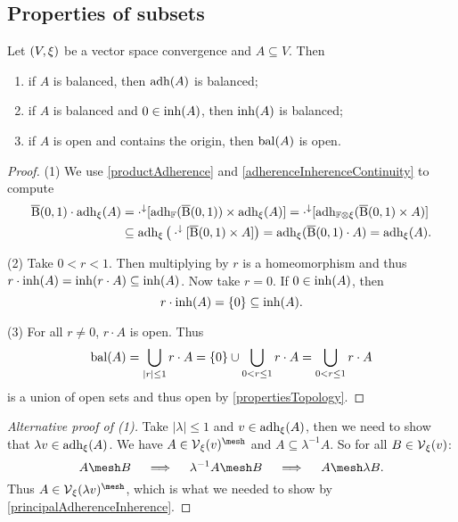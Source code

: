 \subsection{Properties of subsets}
\begin{proposition} \label{inherenceAdherenceBalanced}
Let $\left( V,\xi \right)$ be a vector space convergence and $A\subseteq V$. Then
\begin{enumerate}
\item if $A$ is balanced, then $\operatorname{adh}(A)$ is balanced;
\item if $A$ is balanced and $0\in\operatorname{inh}(A)$, then $\operatorname{inh}(A)$ is balanced;
\item if $A$ is open and contains the origin, then $\operatorname{bal}(A)$ is open.
\end{enumerate}
\end{proposition}
\begin{proof}
(1) We use \ref{productAdherence} and \ref{adherenceInherenceContinuity} to compute
\begin{align*}
\operatorname{\overline{B}}(0,1)\cdot \operatorname{adh}_\xi(A) &= \cdot^\downarrow[\operatorname{adh}_{\mathbb{F}}(\operatorname{\overline{B}}(0,1))\times \operatorname{adh}_\xi(A)] = \cdot^\downarrow[\operatorname{adh}_{\mathbb{F}\otimes \xi}(\operatorname{\overline{B}}(0,1)\times A)] \\
&\subseteq \operatorname{adh}_{\xi}\big(\cdot^\downarrow[\operatorname{\overline{B}}(0,1)\times A]\big) = \operatorname{adh}_{\xi}(\operatorname{\overline{B}}(0,1)\cdot A) = \operatorname{adh}_\xi(A).
\end{align*}

(2) Take $0<r<1$. Then multiplying by $r$ is a homeomorphism and thus $r\cdot\operatorname{inh}(A) = \operatorname{inh}(r\cdot A) \subseteq \operatorname{inh}(A)$. Now take $r=0$. If $0\in\operatorname{inh}(A)$, then
\[ r\cdot\operatorname{inh}(A) = \{0\} \subseteq \operatorname{inh}(A). \]

(3) For all $r\neq 0$, $r\cdot A$ is open. Thus
\[ \operatorname{bal}(A) = \bigcup_{|r|\leq 1}r\cdot A = \{0\}\cup \bigcup_{0< r\leq 1}r\cdot A = \bigcup_{0< r\leq 1}r\cdot A \]
is a union of open sets and thus open by \ref{propertiesTopology}.
\end{proof}
\begin{proof}[Alternative proof of (1)]
Take $|\lambda|\leq 1$ and $v\in \operatorname{adh}_\xi(A)$, then we need to show that $\lambda v \in \operatorname{adh}_\xi(A)$. We have $A\in \vicinity_\xi(v)^{\mesh}$ and $A\subseteq \lambda^{-1}A$. So for all $B\in \operatorname{\mathcal{V}}_\xi(v)$:
\[ A\mesh B \quad\implies\quad \lambda^{-1}A\mesh B \quad\implies\quad A\mesh \lambda B. \]
Thus $A\in \vicinity_\xi(\lambda v)^{\mesh}$, which is what we needed to show by \ref{principalAdherenceInherence}.
\end{proof}

